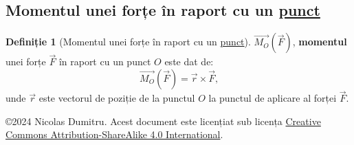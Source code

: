 \documentclass[a4paper]{article}
\theoremstyle{definition}
\newtheorem{definition}{Definiție}[section]
\theoremstyle{plain}%
\theoremstyle{remark}
\begin{document}
\subsection{Momentul unei forțe în raport cu un \underline{punct}}

\begin{definition}[Momentul unei forțe în raport cu un \underline{punct}]
	\(\overrightarrow{M_O}(\vec F)\), \textbf{momentul} unei forțe \(\vec F\) în raport cu un punct \(O\) este dat de:
	\begin{equation*}
        \overrightarrow{M_O}(\vec F) = \vec r \times \vec F \text{,}
	\end{equation*}
	unde \(\vec r\) este vectorul de poziție de la punctul \(O\) la punctul de aplicare al forței \(\vec F\).
\end{definition}

\begin{flushright}
	\copyright 2024 Nicolas Dumitru.
	Acest document este licențiat sub licența \href{https://creativecommons.org/licenses/by-sa/4.0/}{Creative Commons Attribution-ShareAlike 4.0 International}.

\end{flushright}
\end{document}
